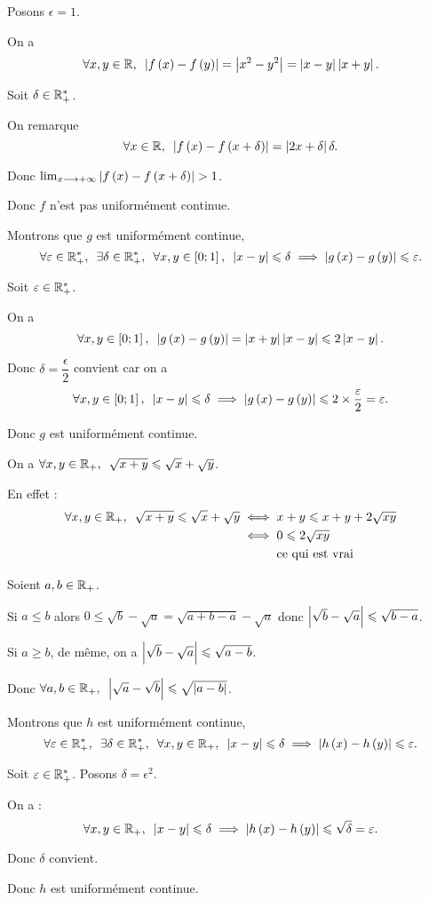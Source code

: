 \begin{corr}[\(f\)]
Posons \(\epsilon=1\).

On a \[\quantifs{\forall x,y\in\R}\abs{f\paren{x}-f\paren{y}}=\abs{x^2-y^2}=\abs{x-y}\abs{x+y}.\]

Soit \(\delta\in\mathbb{R}_+^*\).

On remarque \[\quantifs{\forall x\in\R}\abs{f\paren{x}-f\paren{x+\delta}}=\abs{2x+\delta}\delta.\]

Donc \(\lim_{x\longrightarrow+\infty}\left\lvert f\left(x\right)-f\left(x+\delta\right)\right\rvert>1\).

Donc \(f\) n'est pas uniformément continue.
\end{corr}

\begin{corr}[\(g\)]
Montrons que \(g\) est uniformément continue, \cad \[\quantifs{\forall\epsilon\in\Rps;\exists\delta\in\Rps;\forall x,y\in\intervii{0}{1}}\abs{x-y}\leq\delta\imp\abs{g\paren{x}-g\paren{y}}\leq\epsilon.\]

Soit \(\varepsilon\in\mathbb{R}_+^*\).

On a \[\quantifs{\forall x,y\in\intervii{0}{1}}\abs{g\paren{x}-g\paren{y}}=\abs{x+y}\abs{x-y}\leq2\abs{x-y}.\]

Donc \(\delta=\dfrac{\epsilon}{2}\) convient car on a \[\quantifs{\forall x,y\in\intervii{0}{1}}\abs{x-y}\leq\delta\imp\abs{g\paren{x}-g\paren{y}}\leq2\times\dfrac{\epsilon}{2}=\epsilon.\]

Donc \(g\) est uniformément continue.
\end{corr}

\begin{corr}[\(h\)]
On a \(\quantifs{\forall x,y\in\Rp}\sqrt{x+y}\leq\sqrt{x}+\sqrt{y}\).

En effet : \[\begin{aligned}
\quantifs{\forall x,y\in\Rp}\sqrt{x+y}\leq\sqrt{x}+\sqrt{y}&\ssi x+y\leq x+y+2\sqrt{xy} \\
&\ssi0\leq2\sqrt{xy} \\
&\color{white}\ssi\color{black}\text{ce qui est vrai}
\end{aligned}\]

Soient \(a,b\in\mathbb{R}_+\).

Si \(a\leq b\) alors \(0\leq\sqrt{b}-\sqrt{a}=\sqrt{a+b-a}-\sqrt{a}\) donc \(\left\lvert\sqrt{b}-\sqrt{a}\right\rvert\leqslant\sqrt{b-a}\).

Si \(a\geq b\), de même, on a \(\left\lvert\sqrt{b}-\sqrt{a}\right\rvert\leqslant\sqrt{a-b}\).

Donc \(\quantifs{\forall a,b\in\Rp}\abs{\sqrt{a}-\sqrt{b}}\leq\sqrt{\abs{a-b}}\).

Montrons que \(h\) est uniformément continue, \cad \[\quantifs{\forall\epsilon\in\Rps;\exists\delta\in\Rps;\forall x,y\in\Rp}\abs{x-y}\leq\delta\imp\abs{h\paren{x}-h\paren{y}}\leq\epsilon.\]

Soit \(\varepsilon\in\mathbb{R}_+^*\). Posons \(\delta=\epsilon^2\).

On a : \[\quantifs{\forall x,y\in\Rp}\abs{x-y}\leq\delta\imp\abs{h\paren{x}-h\paren{y}}\leq\sqrt{\delta}=\epsilon.\]

Donc \(\delta\) convient.

Donc \(h\) est uniformément continue.
\end{corr}

